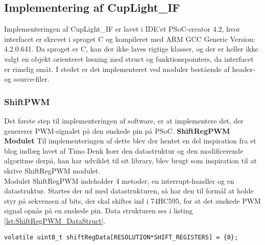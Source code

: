 \documentclass[Softwaredesign/Softwaredesign_main.tex]{subfiles}
\begin{document}
\subsection{Implementering af CupLight\_IF}\label{sec:cuplight_sw_impl}
Implementeringen af CupLight\_IF er lavet i IDE'et PSoC-creator 4.2, hvor interfacet er skrevet i sproget C og kompileret med ARM GCC Generic Version: 4.2.0.641. Da sproget er C, kan der ikke laves rigtige klasser, og der er heller ikke valgt en objekt orienteret løsning med struct og funktionspointers, da interfacet er rimelig småt. I stedet er det implementeret ved moduler bestående af header- og source-filer.
\subsubsection{ShiftPWM}
Det første step til implementeringen af software, er at implementere det, der genererer PWM-signalet på den ønskede pin på PSoC. 
\textbf{ShiftRegPWM Modulet}
Til implementeringen af dette blev der hentet en del inspiration fra et blog indlæg lavet af Timo Denk \cite{shiftregpwm} Især den datastruktur og den modificerende algoritme derpå,  han har udviklet til sit library, blev brugt som inspiration til at skrive ShiftRegPWM modulet. 
\\Modulet ShiftRegPWM indeholder 4 metoder, en interrupt-handler og en datastruktur. Startes der ud med datastrukturen, så har den  til formål at holde styr på sekvensen af bits, der skal skiftes ind i 74HC595, for at det ønskede PWM signal opnås på en ønskede pin. Data strukturen ses i listing \ref{lst:ShiftRegPWM_DataStruct}.

\begin{lstlisting}[caption={Datastruktur for ShiftRegPWM}, label={lst:ShiftRegPWM_DataStruct},
style=customc]
volatile uint8_t shiftRegData[RESOLUTION*SHIFT_REGISTERS] = {0};
\end{lstlisting}
\end{document}
